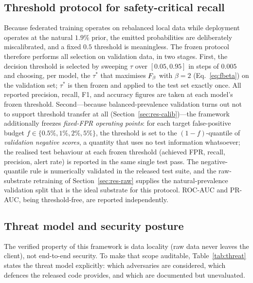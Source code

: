 \subsection{Threshold protocol for safety-critical recall}
\label{sec:thresholding}

Because federated training operates on rebalanced local data while
deployment operates at the natural $1.9\%$ prior, the emitted
probabilities are deliberately miscalibrated, and a fixed $0.5$
threshold is meaningless. The frozen protocol therefore performs all
selection on validation data, in two stages. First, the decision
threshold is selected by sweeping $\tau$ over $[0.05, 0.95]$ in steps
of $0.005$ and choosing, per model, the $\tau^\ast$ that maximises
$F_{\beta}$ with $\beta=2$ (Eq.~\eqref{eq:fbeta}) on the validation set;
$\tau^\ast$ is then frozen and applied to the test set exactly once.
All reported precision, recall, F1, and accuracy figures are taken at
each model's frozen threshold. Second---because balanced-prevalence
validation turns out not to support threshold transfer at all
(Section~\ref{sec:res-calib})---the framework additionally freezes
\emph{fixed-FPR operating points}: for each target false-positive
budget $f \in \{0.5\%, 1\%, 2\%, 5\%\}$, the threshold is set to the
$(1-f)$-quantile of \emph{validation negative scores}, a quantity that
uses no test information whatsoever; the realised test behaviour at
each frozen threshold (achieved FPR, recall, precision, alert rate) is
reported in the same single test pass. The negative-quantile rule is
numerically validated in the released test suite, and the
raw-substrate retraining of Section~\ref{sec:res-raw} supplies the
natural-prevalence validation split that is the ideal substrate for
this protocol.
ROC-AUC and PR-AUC, being threshold-free, are reported independently.

\subsection{Threat model and security posture}
\label{sec:threatmodel}

The verified property of this framework is data locality (raw data
never leaves the client), not end-to-end security. To make that scope
auditable, Table~\ref{tab:threat} states the threat model explicitly:
which adversaries are considered, which defences the released code
provides, and which are documented but unevaluated.

